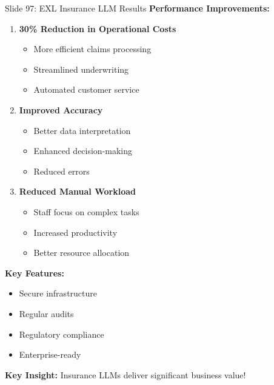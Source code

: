 \documentclass[8pt]{beamer}
\begin{document}
	\begin{frame}{Slide 97: EXL Insurance LLM Results}
		\fontsize{6.5}{7.5}\selectfont
		\textbf{Performance Improvements:}
		\begin{enumerate}
			\item \textbf{30\% Reduction in Operational Costs}
			\begin{itemize}
				\item More efficient claims processing
				\item Streamlined underwriting
				\item Automated customer service
			\end{itemize}
			\item \textbf{Improved Accuracy}
			\begin{itemize}
				\item Better data interpretation
				\item Enhanced decision-making
				\item Reduced errors
			\end{itemize}
			\item \textbf{Reduced Manual Workload}
			\begin{itemize}
				\item Staff focus on complex tasks
				\item Increased productivity
				\item Better resource allocation
			\end{itemize}
		\end{enumerate}
		
		\vspace{0.1cm}
		\textbf{Key Features:}
		\begin{itemize}
			\item Secure infrastructure
			\item Regular audits
			\item Regulatory compliance
			\item Enterprise-ready
		\end{itemize}
		
		\textcolor{myblue}{\textbf{Key Insight:}} Insurance LLMs deliver significant business value!
	\end{frame}
	
\end{document}
